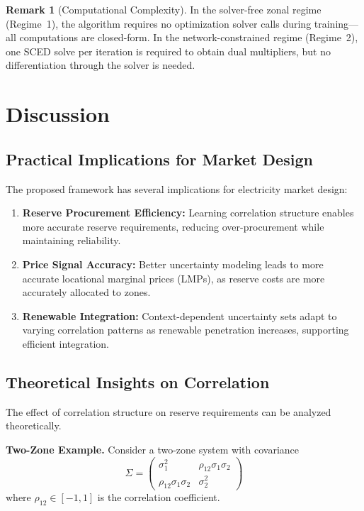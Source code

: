 \documentclass[lettersize,journal]{IEEEtran}
\theoremstyle{definition}
\newtheorem{remark}{Remark}
\begin{document}
\begin{remark}[Computational Complexity]
In the solver-free zonal regime (Regime~1), the algorithm requires no optimization solver calls during training---all computations are closed-form. In the network-constrained regime (Regime~2), one SCED solve per iteration is required to obtain dual multipliers, but no differentiation through the solver is needed.
\end{remark}

\section{Discussion}
\label{sec:discussion}

\subsection{Practical Implications for Market Design}

The proposed framework has several implications for electricity market design:

\begin{enumerate}
\item \textbf{Reserve Procurement Efficiency:} Learning correlation structure enables more accurate reserve requirements, reducing over-procurement while maintaining reliability.

\item \textbf{Price Signal Accuracy:} Better uncertainty modeling leads to more accurate locational marginal prices (LMPs), as reserve costs are more accurately allocated to zones.

\item \textbf{Renewable Integration:} Context-dependent uncertainty sets adapt to varying correlation patterns as renewable penetration increases, supporting efficient integration.
\end{enumerate}

\subsection{Theoretical Insights on Correlation}

The effect of correlation structure on reserve requirements can be analyzed theoretically.

\textbf{Two-Zone Example.} Consider a two-zone system with covariance
\begin{equation}
\Sigma = \begin{pmatrix} \sigma_1^2 & \rho_{12}\sigma_1\sigma_2 \\ \rho_{12}\sigma_1\sigma_2 & \sigma_2^2 \end{pmatrix}
\end{equation}
where $\rho_{12} \in [-1,1]$ is the correlation coefficient.
\end{document}
